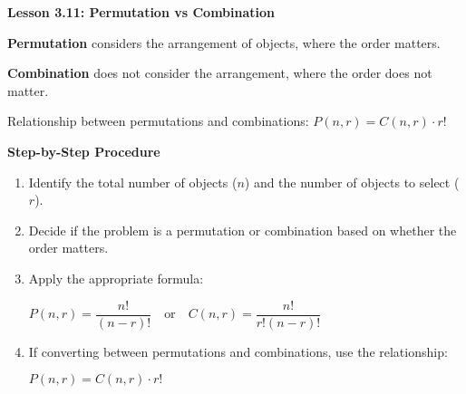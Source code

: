 \begin{center}
\textbf{Lesson 3.11: Permutation vs Combination}
\end{center}

\vspace*{-1.5ex}

\noindent \textbf{Permutation} considers the arrangement of objects, where the order matters.

\noindent \textbf{Combination} does not consider the arrangement, where the order does not matter.



\noindent  Relationship between permutations and combinations:  \(P(n, r) = C(n, r) \cdot r!\)

\noindent\textbf{Step-by-Step Procedure}

\begin{enumerate}
    \item Identify the total number of objects (\(n\)) and the number of objects to select (\(r\)).
    \item Decide if the problem is a permutation or combination based on whether the order matters.
    \item Apply the appropriate formula:

{\centering $ 
    P(n, r) = \dfrac{n!}{(n-r)!} \quad \text{or} \quad C(n, r) = \dfrac{n!}{r!(n-r)!}
    $\par}
  
    \item If converting between permutations and combinations, use the relationship:

{\centering $ 
    P(n, r) = C(n, r) \cdot r!
 $\par}      
\end{enumerate}
